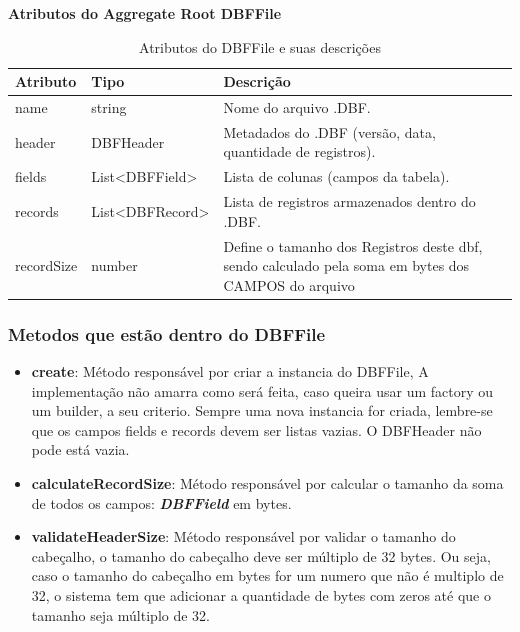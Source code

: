 \begin{table}[H]
    \centering
    \textbf{Atributos do Aggregate Root DBFFile}
    \begin{tabular}{|p{} | p{} | p{}|}
        \hline
        \textbf{Atributo} & \textbf{Tipo} & \textbf{Descrição} \\
        \hline
        name & string & Nome do arquivo .DBF. \\
        \hline
        header & DBFHeader & Metadados do .DBF (versão, data, quantidade de registros). \\
        \hline
        fields & List<DBFField> & Lista de colunas (campos da tabela). \\
        \hline
        records & List<DBFRecord> & Lista de registros armazenados dentro do .DBF. \\
        \hline
        recordSize & number & Define o tamanho dos Registros deste dbf, sendo calculado pela soma em bytes dos CAMPOS do arquivo \\
        \hline
    \end{tabular}
    \caption{Atributos do DBFFile e suas descrições}
    \label{tab:tabela_atributos_dbffile}
\end{table}

\subsubsection{Metodos que estão dentro do DBFFile}
\begin{itemize}
    \item \textbf{create}: Método responsável por criar a instancia do DBFFile, A implementação não amarra como será feita, caso queira usar um factory ou um builder, a seu criterio. Sempre uma nova instancia for criada, lembre-se que os campos fields e records devem ser listas vazias. O DBFHeader não pode está vazia.
    \item \textbf{calculateRecordSize}: Método responsável por calcular o tamanho da soma de todos os campos: \textit{\textbf{DBFField}} em bytes.
    \item \textbf{validateHeaderSize}: Método responsável por validar o tamanho do cabeçalho, o tamanho do cabeçalho deve ser múltiplo de 32 bytes. Ou seja, caso o tamanho do cabeçalho em bytes for um numero que não é multiplo de 32, o sistema tem que adicionar a quantidade de bytes com zeros até que o tamanho seja múltiplo de 32.
\end{itemize}

